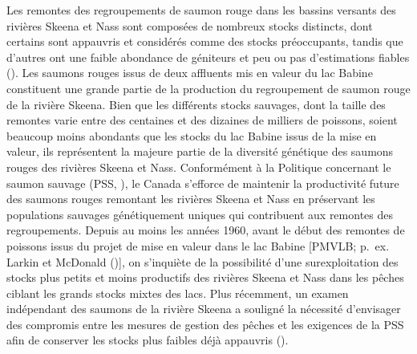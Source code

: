\documentclass[french,11pt]{book}
\begin{document}
Les remontes des regroupements de saumon rouge dans les bassins versants des rivières Skeena et Nass sont composées de nombreux stocks distincts, dont certains sont appauvris et considérés comme des stocks préoccupants, tandis que d'autres ont une faible abondance de géniteurs et peu ou pas d'estimations fiables (). Les saumons rouges issus de deux affluents mis en valeur du lac Babine constituent une grande partie de la production du regroupement de saumon rouge de la rivière Skeena. Bien que les différents stocks sauvages, dont la taille des remontes varie entre des centaines et des dizaines de milliers de poissons, soient beaucoup moins abondants que les stocks du lac Babine issus de la mise en valeur, ils représentent la majeure partie de la diversité génétique des saumons rouges des rivières Skeena et Nass. Conformément à la Politique concernant le saumon sauvage (PSS, ), le Canada s'efforce de maintenir la productivité future des saumons rouges remontant les rivières Skeena et Nass en préservant les populations sauvages génétiquement uniques qui contribuent aux remontes des regroupements. Depuis au moins les années 1960, avant le début des remontes de poissons issus du projet de mise en valeur dans le lac Babine {[}PMVLB; p.~ex. Larkin et McDonald (){]}, on s'inquiète de la possibilité d'une surexploitation des stocks plus petits et moins productifs des rivières Skeena et Nass dans les pêches ciblant les grands stocks mixtes des lacs. Plus récemment, un examen indépendant des saumons de la rivière Skeena a souligné la nécessité d'envisager des compromis entre les mesures de gestion des pêches et les exigences de la PSS afin de conserver les stocks plus faibles déjà appauvris ().
\end{document}
